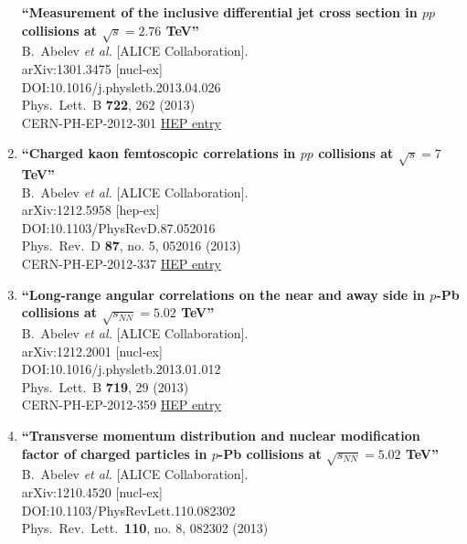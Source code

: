 \begin{enumerate}
{\bf ``Measurement of the inclusive differential jet cross section in $pp$ collisions at $\sqrt{s} = 2.76$ TeV''}
  \\{}B.~Abelev {\it et al.} [ALICE Collaboration].
  \\{}arXiv:1301.3475 [nucl-ex]
  \\{}DOI:10.1016/j.physletb.2013.04.026
  \\{}Phys.\ Lett.\ B {\bf 722}, 262 (2013)
  \\{}CERN-PH-EP-2012-301
\href{http://inspirehep.net/record/1210881}{HEP entry}
\item%
{\bf ``Charged kaon femtoscopic correlations in $pp$ collisions at $\sqrt{s}=7$ TeV''}
  \\{}B.~Abelev {\it et al.} [ALICE Collaboration].
  \\{}arXiv:1212.5958 [hep-ex]
  \\{}DOI:10.1103/PhysRevD.87.052016
  \\{}Phys.\ Rev.\ D {\bf 87}, no. 5, 052016 (2013)
  \\{}CERN-PH-EP-2012-337
\href{http://inspirehep.net/record/1208696}{HEP entry}
\item%
{\bf ``Long-range angular correlations on the near and away side in $p$-Pb collisions at $\sqrt{s_{NN}}=5.02$ TeV''}
  \\{}B.~Abelev {\it et al.} [ALICE Collaboration].
  \\{}arXiv:1212.2001 [nucl-ex]
  \\{}DOI:10.1016/j.physletb.2013.01.012
  \\{}Phys.\ Lett.\ B {\bf 719}, 29 (2013)
  \\{}CERN-PH-EP-2012-359
\href{http://inspirehep.net/record/1206610}{HEP entry}
\item%
{\bf ``Transverse momentum distribution and nuclear modification factor of charged particles in $p$-Pb collisions at $\sqrt{s_{NN}}=5.02$ TeV''}
  \\{}B.~Abelev {\it et al.} [ALICE Collaboration].
  \\{}arXiv:1210.4520 [nucl-ex]
  \\{}DOI:10.1103/PhysRevLett.110.082302
  \\{}Phys.\ Rev.\ Lett.\  {\bf 110}, no. 8, 082302 (2013)

\end{enumerate}
